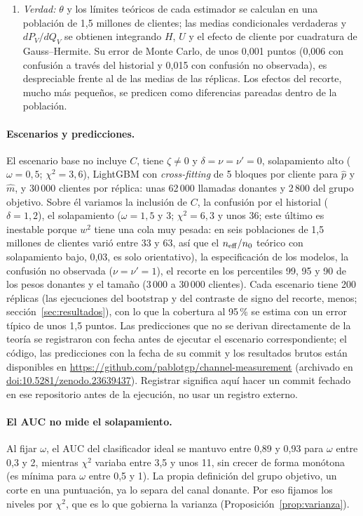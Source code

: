 \begin{enumerate}
  \item \emph{Verdad:} $\theta$ y los límites teóricos de cada estimador se calculan en una población de 1,5 millones de clientes; las medias condicionales verdaderas y $dP_V/dQ_V$ se obtienen integrando $H$, $U$ y el efecto de cliente por cuadratura de Gauss--Hermite. Su error de Monte Carlo, de unos 0,001 puntos (0,006 con confusión a través del historial y 0,015 con confusión no observada), es despreciable frente al de las medias de las réplicas. Los efectos del recorte, mucho más pequeños, se predicen como diferencias pareadas dentro de la población.
\end{enumerate}

\paragraph{Escenarios y predicciones.} El escenario base no incluye $C$, tiene $\zeta\ne0$ y $\delta=\nu=\nu'=0$, solapamiento alto ($\omega=0,5$; $\chi^2=3,6$), LightGBM \citep{ke2017} con \emph{cross-fitting} de 5 bloques por cliente para $\hat p$ y $\hat m$, y 30\,000 clientes por réplica: unas 62\,000 llamadas donantes y 2\,800 del grupo objetivo. Sobre él variamos la inclusión de $C$, la confusión por el historial ($\delta=1,2$), el solapamiento ($\omega=1,5$ y $3$; $\chi^2=6,3$ y unos 36; este último es inestable porque $w^2$ tiene una cola muy pesada: en seis poblaciones de 1,5 millones de clientes varió entre 33 y 63, así que el $n_{\mathrm{eff}}/n_0$ teórico con solapamiento bajo, 0,03, es solo orientativo), la especificación de los modelos, la confusión no observada ($\nu=\nu'=1$), el recorte en los percentiles 99, 95 y 90 de los pesos donantes y el tamaño (3\,000 a 30\,000 clientes). Cada escenario tiene 200 réplicas (las ejecuciones del bootstrap y del contraste de signo del recorte, menos; sección~\ref{sec:resultados}), con lo que la cobertura al 95\,\% se estima con un error típico de unos 1,5 puntos. Las predicciones que no se derivan directamente de la teoría se registraron con fecha antes de ejecutar el escenario correspondiente; el código, las predicciones con la fecha de su commit y los resultados brutos están disponibles en \url{https://github.com/pablotgp/channel-measurement} (archivado en \href{https://doi.org/10.5281/zenodo.23639437}{doi:10.5281/zenodo.23639437}). Registrar significa aquí hacer un commit fechado en ese repositorio antes de la ejecución, no usar un registro externo.

\paragraph{El AUC no mide el solapamiento.} Al fijar $\omega$, el AUC del clasificador ideal se mantuvo entre 0,89 y 0,93 para $\omega$ entre 0,3 y 2, mientras $\chi^2$ variaba entre 3,5 y unos 11, sin crecer de forma monótona (es mínima para $\omega$ entre 0,5 y 1). La propia definición del grupo objetivo, un corte en una puntuación, ya lo separa del canal donante. Por eso fijamos los niveles por $\chi^2$, que es lo que gobierna la varianza (Proposición~\ref{prop:varianza}).

